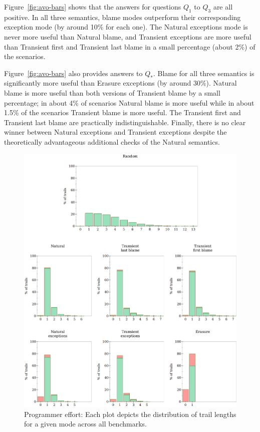 Figure~\ref{fig:avo-bars} shows that the answers for questions $Q_1$ to $Q_3$ are all positive.
In all three semantics, blame modes outperform their corresponding exception mode (by around 10\% for each one).
The Natural exceptions mode is never more useful than Natural blame, and  Transient
exceptions are more useful than Transient first and Transient last blame
in a small percentage (about 2\%) of the scenarios. 

Figure~\ref{fig:avo-bars} also provides answers to $Q_*$.
Blame for all three semantics is significantly
more useful than Erasure exceptions (by around 30\%). Natural blame is
more useful than both versions of Transient blame by a small percentage;
in about 4\% of scenarios Natural blame is more useful while in about 1.5\% of the
scenarios Transient blame is more useful. The Transient first and
Transient last blame are practically indistinguishable. Finally, there is
no clear winner between Natural exceptions and Transient exceptions
despite the theoretically advantageous additional checks of the Natural
semantics.

\begin{figure}
  \centering
  \includegraphics[width=\textwidth]{./plots/bt-lengths-table}
  \caption{Programmer effort: Each plot depicts the distribution of trail
  lengths for a given mode across all benchmarks.}
  \label{fig:effort-table}
\end{figure}

